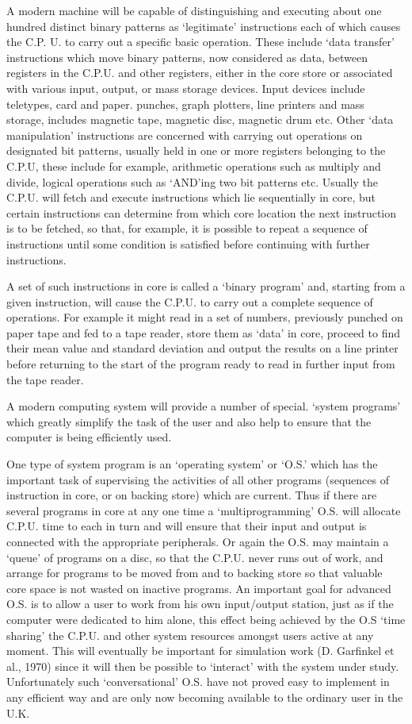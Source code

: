 A modern machine will be capable of distinguishing and executing about one hundred distinct binary patterns as `legitimate' instructions each of which causes the C.P. U. to carry out a specific basic operation. These include `data transfer' instructions which move binary patterns, now considered as data, between registers in the C.P.U. and other registers, either in the core store or associated with various input, output, or mass storage devices. Input devices include teletypes, card and paper. punches, graph plotters, line printers and mass storage, includes magnetic tape, magnetic disc, magnetic drum etc. Other `data manipulation' instructions are concerned with carrying out operations on designated bit patterns, usually held in one or more registers belonging to the C.P.U, these include for example, arithmetic operations such as multiply and divide, logical operations such as `AND'ing two bit patterns etc. Usually the C.P.U. will fetch and execute instructions which lie sequentially in core, but certain instructions can determine from which core location the next instruction is to be fetched, so that, for example, it is possible to repeat a sequence of instructions until some condition is satisfied before continuing with further instructions.

A set of such instructions in core is called a `binary program' and, starting from a given instruction, will cause the C.P.U. to carry out a complete sequence of operations. For example it might read in a set of numbers, previously punched on paper tape and fed to a tape reader, store them as `data' in core, proceed to find their mean value and standard deviation and output the results on a line printer before returning to the start of the program ready to read in further input from the tape reader.

A modern computing system will provide a number of special. `system programs' which greatly simplify the task of the user and also help to ensure that the computer is being efficiently used.

One type of system program is an `operating system' or `O.S.' which has the important task of supervising the activities of all other programs (sequences of instruction in core, or on backing store) which are current. Thus if there are several programs in core at any one time a `multiprogramming' O.S. will allocate C.P.U. time to each in turn and will ensure that their input and output is connected with the appropriate peripherals. Or again the O.S. may maintain a `queue' of programs on a disc, so that the C.P.U. never runs out of work, and arrange for programs to be moved from and to backing store so that valuable core space is not wasted on inactive programs. An important goal for advanced O.S. is to allow a user to work from his own input/output station, just as if the computer were dedicated to him alone, this effect being achieved by the O.S `time sharing' the C.P.U. and other system resources amongst users active at any moment. This will eventually be important for simulation work (D. Garfinkel et al., 1970) since it will then be possible to `interact' with the system under study. Unfortunately such `conversational' O.S. have not proved easy to implement in any efficient way and are only now becoming available to the ordinary user in the U.K.


